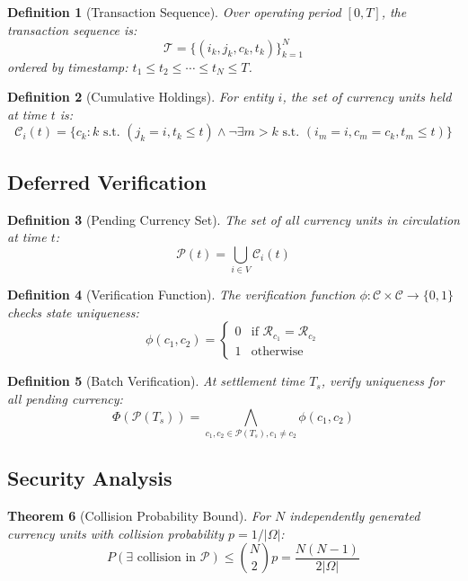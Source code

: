 \documentclass[12pt]{article}
\newtheorem{theorem}{Theorem}
\newtheorem{definition}[theorem]{Definition}
\begin{document}
\begin{definition}[Transaction Sequence]
Over operating period $[0,T]$, the transaction sequence is:
$$
\mathcal{T} = \{(i_k, j_k, c_k, t_k)\}_{k=1}^{N}
$$
ordered by timestamp: $t_1 \leq t_2 \leq \cdots \leq t_N \leq T$.
\end{definition}

\begin{definition}[Cumulative Holdings]
For entity $i$, the set of currency units held at time $t$ is:
$$
\mathcal{C}_i(t) = \{c_k : k \text{ s.t. } (j_k = i, t_k \leq t) \wedge \neg\exists m > k \text{ s.t. } (i_m = i, c_m = c_k, t_m \leq t)\}
$$
\end{definition}

\subsection{Deferred Verification}

\begin{definition}[Pending Currency Set]
The set of all currency units in circulation at time $t$:
$$
\mathcal{P}(t) = \bigcup_{i \in V} \mathcal{C}_i(t)
$$
\end{definition}

\begin{definition}[Verification Function]
The verification function $\phi: \mathcal{C} \times \mathcal{C} \to \{0,1\}$ checks state uniqueness:
$$
\phi(c_1, c_2) = \begin{cases}
0 & \text{if } \mathcal{R}_{c_1} = \mathcal{R}_{c_2} \\
1 & \text{otherwise}
\end{cases}
$$
\end{definition}

\begin{definition}[Batch Verification]
At settlement time $T_s$, verify uniqueness for all pending currency:
$$
\Phi(\mathcal{P}(T_s)) = \bigwedge_{c_1, c_2 \in \mathcal{P}(T_s), c_1 \neq c_2} \phi(c_1, c_2)
$$
\end{definition}

\subsection{Security Analysis}

\begin{theorem}[Collision Probability Bound]
For $N$ independently generated currency units with collision probability $p = 1/|\Omega|$:
$$
P(\exists \text{ collision in } \mathcal{P}) \leq \binom{N}{2} p = \frac{N(N-1)}{2|\Omega|}
$$
\end{theorem}
\end{document}
